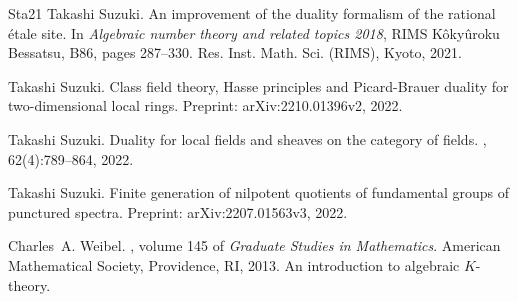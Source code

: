 \documentclass{amsart}
\theoremstyle{remark}
\numberwithin{equation}{subsection}
\begin{document}
\begin{thebibliography}{{Sta}21}
Takashi Suzuki.
\newblock An improvement of the duality formalism of the rational \'{e}tale
  site.
\newblock In {\em Algebraic number theory and related topics 2018}, RIMS
  K\^{o}ky\^{u}roku Bessatsu, B86, pages 287--330. Res. Inst. Math. Sci.
  (RIMS), Kyoto, 2021.

Takashi Suzuki.
\newblock Class field theory, {H}asse principles and {P}icard-{B}rauer duality
  for two-dimensional local rings.
\newblock Preprint: arXiv:2210.01396v2, 2022.

Takashi Suzuki.
\newblock Duality for local fields and sheaves on the category of fields.
, 62(4):789--864, 2022.

Takashi Suzuki.
\newblock Finite generation of nilpotent quotients of fundamental groups of
  punctured spectra.
\newblock Preprint: arXiv:2207.01563v3, 2022.

Charles~A. Weibel.
, volume 145 of {\em Graduate Studies in
  Mathematics}.
\newblock American Mathematical Society, Providence, RI, 2013.
\newblock An introduction to algebraic $K$-theory.

\end{thebibliography}
\end{document}
